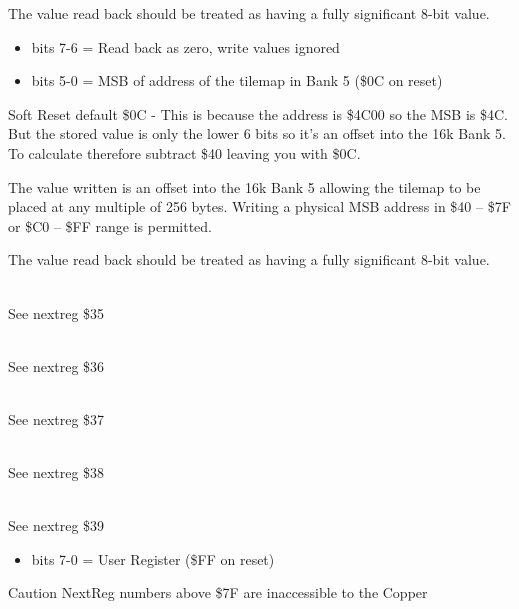 The value read back should be treated as having a fully significant
8-bit value.

\begin{itemize}
\item bits 7-6 = Read back as zero, write values ignored
\item bits 5-0 = MSB of address of the tilemap in Bank 5 (\$0C on
  reset)
\end{itemize}
Soft Reset default \$0C - This is because the address is \$4C00 so the
MSB is \$4C. But the stored value is only the lower 6 bits so it's an
offset into the 16k Bank 5. To calculate therefore subtract \$40
leaving you with \$0C.

The value written is an offset into the 16k Bank 5 allowing the
tilemap to be placed at any multiple of 256 bytes.  Writing a physical
MSB address in \$40 -- \$7F or \$C0 -- \$FF range is permitted.

The value read back should be treated as having a fully significant
8-bit value.

\\
See nextreg \$35

\\
See nextreg \$36

\\
See nextreg \$37

\\
See nextreg \$38

\\
See nextreg \$39

\begin{itemize}
\item bits 7-0 = User Register (\$FF on reset)
\end{itemize}

Caution NextReg numbers above \$7F are inaccessible to the Copper

